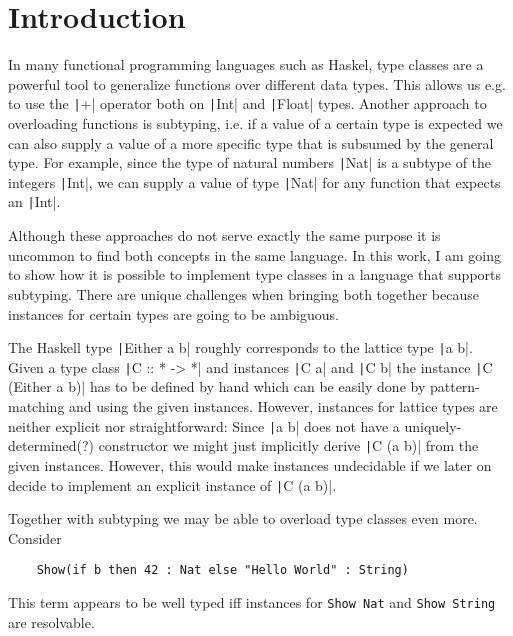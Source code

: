 
\chapter{Introduction}\label{ch:intro}


In many functional programming languages such as Haskel, type classes are a powerful tool to generalize functions over different data types.
This allows us e.g. to use the \texttt|+| operator both on \texttt|Int| and \texttt|Float| types.
Another approach to overloading functions is subtyping, i.e. if a value of a certain type is expected we can also supply a value of a more specific type that is subsumed by the general type.
For example, since the type of natural numbers \texttt|Nat| is a subtype of the integers \texttt|Int|, we can supply a value of type \texttt|Nat| for any function that expects an \texttt|Int|.

Although these approaches do not serve exactly the same purpose it is uncommon to find both concepts in the same language.
In this work, I am going to show how it is possible to implement type classes in a language that supports subtyping.
There are unique challenges when bringing both together because instances for certain types are going to be ambiguous.

The Haskell type \texttt|Either a b| roughly corresponds to the lattice type \texttt|a \/ b|.
Given a type class \texttt|C :: * -> *| and instances \texttt|C a| and \texttt|C b| the instance \texttt|C (Either a b)| has to be defined by hand which can be easily done by pattern-matching and using the given instances.
However, instances for lattice types are neither explicit nor straightforward:
Since \texttt|a \/ b| does not have a uniquely-determined(?) constructor we might just implicitly derive \texttt|C (a \/ b)| from the given instances.
However, this would make instances undecidable if we later on decide to implement an explicit instance of \texttt|C (a \/ b)|.

Together with subtyping we may be able to overload type classes even more.
Consider
\begin{verbatim}
    Show(if b then 42 : Nat else "Hello World" : String)
\end{verbatim}
This term appears to be well typed iff instances for \texttt{Show Nat} and \texttt{Show String} are resolvable.

